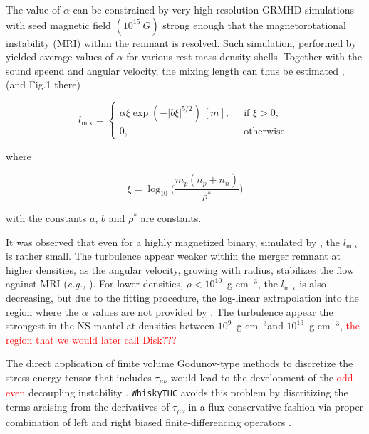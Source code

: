 \documentclass[11pt,a4paper,headinclude=true,DIV=14,BCOR=8mm,chapterprefix,listof=totoc,twoside,openright,abstracton]{scrbook}
\newcommand{\red}[1]{\textcolor{red}{#1}}
\newcommand{\gcm}{g cm$^{-3}$}
\begin{document}
The value of $\alpha$ can be constrained by very high resolution GRMHD simulations with seed magnetic field $(10^{15}~G)$ strong enough that the magnetorotational instability (MRI) within the remnant is resolved. 
Such simulation, performed by \cite{Kiuchi:2017zzg} yielded average values of $\alpha$ for various rest-mass density shells.
Together with the sound speend and angular velocity, the mixing length can thus be estimated \cite{Radice:2020ids}, (and Fig.1 there) 

\begin{equation}
    l_{\text{mix}} = 
    \begin{cases}
        \alpha \xi \exp(-|b\xi|^{5/2}) \: [m], \: &\text{ if } \xi > 0, \\
        0, &\text{ otherwise }
    \end{cases}
\end{equation}

where 

\begin{equation}
    \xi = \log_{10}\Big( \frac{m_p(n_p + n_n)}{\rho^*} \Big)
\end{equation}

with the constants $a$, $b$ and $\rho^*$ are constants.

It was observed that even for a highly magnetized binary, simulated by \cite{Kiuchi:2017zzg}, the $l_{\text{mix}}$ is rather small. The turbulence appear weaker within the merger remnant at higher densities, as the angular velocity, growing with radius, stabilizes the flow against MRI (\textit{e.g.,} \cite{Radice:2017lry}). 
For lower densities, $\rho<10^{10}$~\gcm, the $l_{\text{mix}}$ is also decreasing, but due to the fitting procedure, the log-linear extrapolation into the region where the $\alpha$ values are not provided by \cite{Kiuchi:2017zzg}.
The turbulence appear the strongest in the NS mantel at densities between $10^{9}$~\gcm and $10^{13}$~\gcm,
\red{the region that we would later call Disk???}










The direct application of finite volume Godunov-type methods to discretize the stress-energy tensor 
that includes $\tau_{\mu\nu}$ would lead to the development of the \red{odd-even} decoupling instability \cite{Lowrie:2002}.
\texttt{WhiskyTHC} avoids this problem by discritizing the terms araising from the derivatives of $\tau_{\mu\nu}$
in a flux-conservative fashion via proper combination of left and right biased finite-differencing operators \cite{Radice:2018pdn}.
\end{document}
